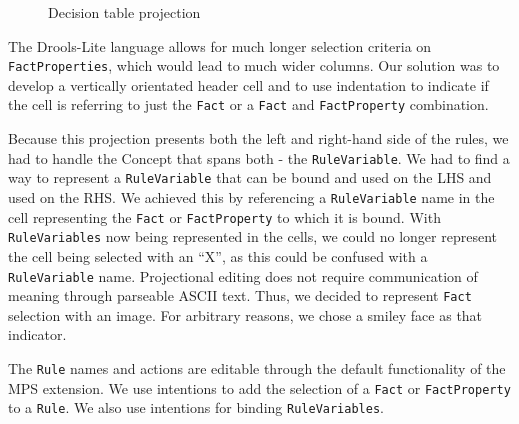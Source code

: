 \begin{figure}
    \centering
    \caption{Decision table projection}
    \label{fig:decisionTableProjection}
\end{figure}

The Drools-Lite language allows for much longer selection criteria on \texttt{FactProperties}, which would lead to much wider columns.
Our solution was to develop a vertically orientated header cell and to use indentation to indicate if the cell is referring to just the \texttt{Fact} or a \texttt{Fact} and \texttt{FactProperty} combination.

Because this projection presents both the left and right-hand side of the rules, we had to handle the Concept that spans both - the \texttt{RuleVariable}.
We had to find a way to represent a \texttt{RuleVariable} that can be bound and used on the LHS and used on the RHS.
We achieved this by referencing a \texttt{RuleVariable} name in the cell representing the \texttt{Fact} or \texttt{FactProperty} to which it is bound.
With \texttt{RuleVariables} now being represented in the cells, we could no longer represent the cell being selected with an ``X'', as this could be confused with a \texttt{RuleVariable} name.
Projectional editing does not require communication of meaning through parseable ASCII text.
Thus, we decided to represent \texttt{Fact} selection with an image.
For arbitrary reasons, we chose a smiley face as that indicator.

The \texttt{Rule} names and actions are editable through the default functionality of the MPS extension.
We use intentions to add the selection of a \texttt{Fact} or \texttt{FactProperty} to a \texttt{Rule}.
We also use intentions for binding \texttt{RuleVariables}.

